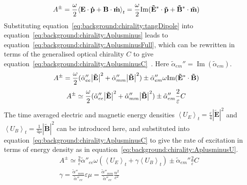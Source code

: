\begin{equation} \label{eq:background:chirality:Aplusminus}
    {A^ \pm } = 
    \frac{\omega }{2}{\left\langle {{\bf{E}} \cdot {\bf{\dot p}} + {\bf{B}} \cdot {\bf{\dot m}}} \right\rangle _t} = 
    \frac{\omega }{2}{\mathop{\rm Im}\nolimits} ({{\bf{\tilde E}}^ * } \cdot {\bf{\tilde p}} + {{\bf{\tilde B}}^ * } \cdot {\bf{\tilde m}})
\end{equation}
Substituting equation~\ref{eq:background:chirality:tangDipole} into equation~\ref{eq:background:chirality:Aplusminus} leads to equation~\ref{eq:background:chirality:AplusminusFull}, which can be rewritten in terms of the generalised optical chirality $C$ to give equation~\ref{eq:background:chirality:AplusminusC}~\cite{Choi2012}. Here ${\tilde \alpha }_{em}''=\operatorname{Im}({\tilde \alpha }_{em})$.
\begin{equation} \label{eq:background:chirality:AplusminusFull}
    {A^ \pm } = \frac{\omega }{2}({\tilde \alpha ''_{ee}}{\left| {{\bf{\tilde E}}} \right|^2} + {\tilde \alpha ''_{mm}}{\left| {{\bf{\tilde B}}} \right|^2}) \pm {\tilde \alpha }_{em}''\omega {\mathop{\rm Im}\nolimits} ({{\bf{\tilde E}}^ * } \cdot {\bf{\tilde B}})
\end{equation}
\begin{equation} \label{eq:background:chirality:AplusminusC}
    {A^ \pm } \simeq \frac{\omega }{2}({\tilde \alpha ''_{ee}}{\left| {{\bf{\tilde E}}} \right|^2} + {\tilde \alpha ''_{mm}}{\left| {{\bf{\tilde B}}} \right|^2}) \pm {\tilde \alpha }_{em}''\frac{2}{\varepsilon }C
\end{equation}
The time averaged electric and magnetic energy densities ${{\left\langle {{U}_{E}} \right\rangle }_{t}}=\tfrac{\varepsilon }{4}{{\left| {\mathbf{\tilde{E}}} \right|}^{2}}$ and ${{\left\langle {{U}_{B}} \right\rangle }_{t}}=\tfrac{1}{4\mu }{{\left| {\mathbf{\tilde{B}}} \right|}^{2}}$  can be introduced here, and substituted into equation~\ref{eq:background:chirality:AplusminusC} to give the rate of excitation in terms of energy density as in equation~\ref{eq:background:chirality:AplusminusU}. 
\begin{equation}\label{eq:background:chirality:AplusminusU}
    \begin{split}
        & {A^ \pm } \simeq \frac{2}{\varepsilon }{{\tilde \alpha ''}_{ee}}\omega \left( {{{\left\langle {{U_E}} \right\rangle }_t} + \gamma {{\left\langle {{U_B}} \right\rangle }_t}} \right) \pm {\tilde \alpha }_{em}''\frac{2}{\varepsilon }C \\
        & \gamma  = \frac{{{{\tilde \alpha ''}_{mm}}}}{{{{\tilde \alpha ''}_{ee}}}}\varepsilon \mu  = \frac{{{{\tilde \alpha ''}_{mm}}}}{{{{\tilde \alpha ''}_{ee}}}}\frac{{{n^2}}}{{{c^2}}}
    \end{split}
\end{equation}
